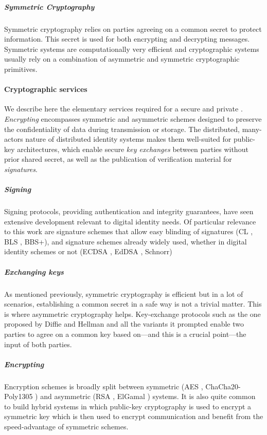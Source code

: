\subparagraph{Symmetric Cryptography} Symmetric cryptography relies on parties agreeing on a common secret to protect information. This secret is used for both encrypting and decrypting messages. Symmetric systems are computationally very efficient and cryptographic systems usually rely on a combination of asymmetric and symmetric cryptographic primitives.

\paragraph{Cryptographic services} 
\label{pa:cryptographic-services}
We describe here the elementary services required for a secure and private \eid. \emph{Encrypting} encompasses symmetric and asymmetric schemes designed to preserve the confidentiality of data during transmission or storage. The distributed, many-actors nature of distributed identity systems makes them well-suited for public-key architectures, which enable secure \emph{key exchanges} between parties without prior shared secret, as well as the publication of verification material for \emph{signatures}.

\subparagraph{Signing} 
\label{sp:signing}
Signing protocols, providing authentication and integrity guarantees, have seen extensive development relevant to digital identity needs. Of particular relevance to this work are signature schemes that allow easy blinding of signatures (CL \cite{CL02}, BLS \cite{BLS01}, BBS+\cite{ASM06}), and signature schemes already widely used, whether in digital identity schemes or not (ECDSA \cite{NIST186-5}, EdDSA \cite{BDLSY11}, Schnorr)

\subparagraph{Exchanging keys}
\label{sp:exchanging-keys}
As mentioned previously, symmetric cryptography is efficient but in a lot of scenarios, establishing a common secret in a safe way is not a trivial matter. This is where asymmetric cryptography helps. Key-exchange protocols such as the one proposed by Diffie and Hellman \cite{DH76} and all the variants it prompted enable two parties to agree on a common key based on---and this is a crucial point---the input of both parties.

\subparagraph{Encrypting} 
\label{sp:encrypting}
Encryption schemes is broadly split between symmetric (AES \cite{NIST2001AES}, ChaCha20-Poly1305 \cite{RFC7539}) and asymmetric (RSA \cite{RSA78}, ElGamal \cite{E85}) systems. It is also quite common to build hybrid systems in which public-key cryptography is used to encrypt a symmetric key which is then used to encrypt communication and benefit from the speed-advantage of symmetric schemes.

